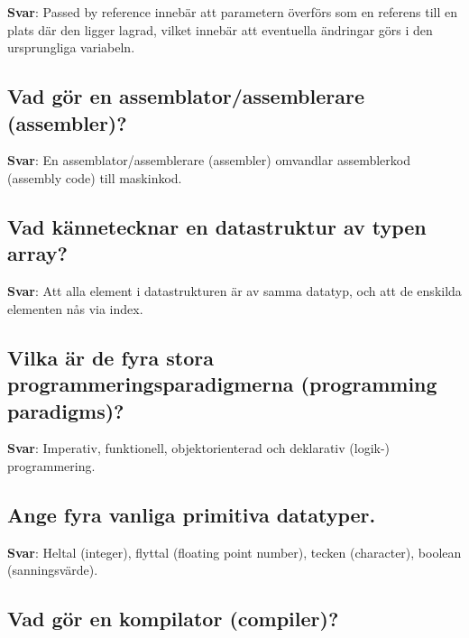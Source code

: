 \documentclass[a4paper,11pt,oneside]{article}
\begin{document}
\begin{sloppypar}
\label{q:196:sa:sv:True}

\textbf{Svar}: Passed by reference inneb\"ar att parametern \"overf\"ors som en referens till en plats d\"ar den ligger lagrad, vilket inneb\"ar att eventuella \"andringar g\"ors i den ursprungliga variabeln.



\subsection{Vad g\"or en assemblator/assemblerare (assembler)?}

\label{q:197:sa:sv:True}

\textbf{Svar}: En assemblator/assemblerare (assembler) omvandlar assemblerkod (assembly code) till maskinkod.



\subsection{Vad k\"annetecknar en datastruktur av typen array?}

\label{q:198:sa:sv:True}

\textbf{Svar}: Att alla element i datastrukturen \"ar av samma datatyp, och att de enskilda elementen n\r{a}s via index.



\subsection{Vilka \"ar de fyra stora programmeringsparadigmerna (programming paradigms)?}

\label{q:199:sa:sv:True}

\textbf{Svar}: Imperativ, funktionell, objektorienterad och deklarativ (logik-) programmering.



\subsection{Ange fyra vanliga primitiva datatyper.}

\label{q:200:sa:sv:True}

\textbf{Svar}: Heltal (integer), flyttal (floating point number), tecken (character), boolean (sanningsv\"arde).



\subsection{Vad g\"or en kompilator (compiler)?}


\end{sloppypar}
\end{document}
